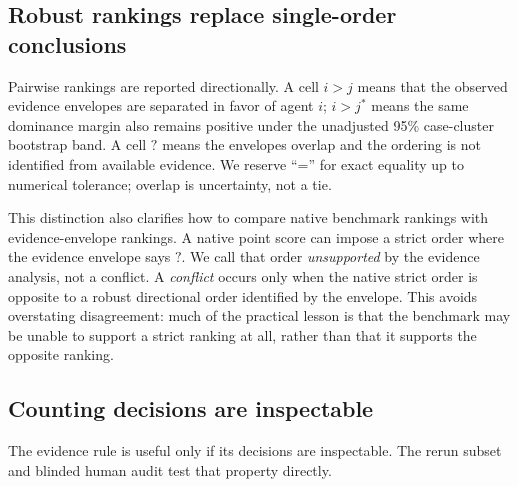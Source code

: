 \documentclass{article}
\begin{document}
\subsection{Robust rankings replace single-order conclusions}
\label{sec:robust-rankings}

Pairwise rankings are reported directionally. A cell \(i>j\) means that the
observed evidence envelopes are separated in favor of agent \(i\);
\(i>j^\ast\) means the same dominance margin also remains positive under the
unadjusted 95\% case-cluster bootstrap band. A cell \(?\) means the envelopes
overlap and the ordering is not identified from available evidence. We reserve
``='' for exact equality up to numerical tolerance; overlap is uncertainty, not
a tie.

This distinction also clarifies how to compare native benchmark rankings with
evidence-envelope rankings. A native point score can impose a strict order
where the evidence envelope says \(?\). We call that order \emph{unsupported}
by the evidence analysis, not a conflict. A \emph{conflict} occurs only when
the native strict order is opposite to a robust directional order identified by
the envelope. This avoids overstating disagreement: much of the practical
lesson is that the benchmark may be unable to support a strict ranking at all,
rather than that it supports the opposite ranking.

\subsection{Counting decisions are inspectable}
\label{sec:inspectable}

The evidence rule is useful only if its decisions are inspectable. The rerun
subset and blinded human audit test that property directly.
\end{document}
